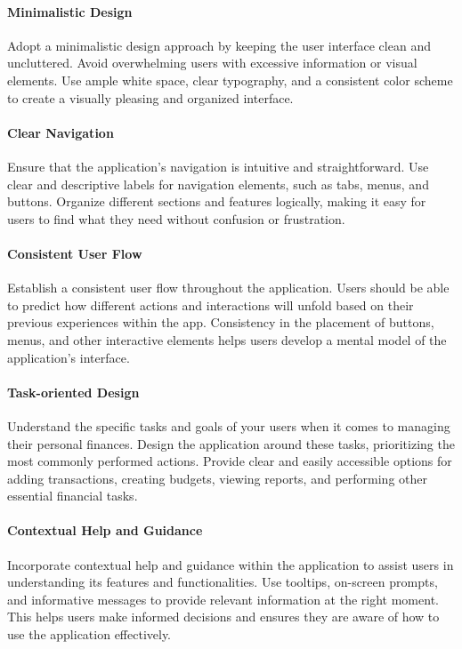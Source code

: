 \paragraph{Minimalistic Design}
Adopt a minimalistic design approach by keeping the user interface clean and uncluttered. 
Avoid overwhelming users with excessive information or visual elements. Use ample white space, clear typography, 
and a consistent color scheme to create a visually pleasing and organized interface.

\paragraph{Clear Navigation}
Ensure that the application's navigation is intuitive and straightforward. Use clear and 
descriptive labels for navigation elements, such as tabs, menus, and buttons. Organize different sections and 
features logically, making it easy for users to find what they need without confusion or frustration.

\paragraph{Consistent User Flow}
Establish a consistent user flow throughout the application. Users should be able to 
predict how different actions and interactions will unfold based on their previous experiences within the app. 
Consistency in the placement of buttons, menus, and other interactive elements helps users develop a mental model 
of the application's interface.

\paragraph{Task-oriented Design}
Understand the specific tasks and goals of your users when it comes to managing their 
personal finances. Design the application around these tasks, prioritizing the most commonly performed actions. 
Provide clear and easily accessible options for adding transactions, creating budgets, viewing reports, and 
performing other essential financial tasks.

\paragraph{Contextual Help and Guidance}
Incorporate contextual help and guidance within the application to assist users in 
understanding its features and functionalities. Use tooltips, on-screen prompts, and informative messages to 
provide relevant information at the right moment. This helps users make informed decisions and ensures they are 
aware of how to use the application effectively.

